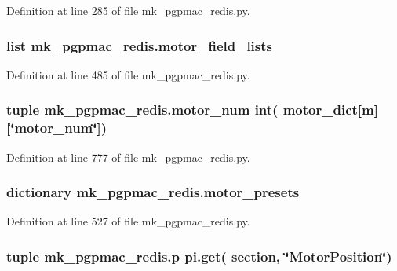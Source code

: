 Definition at line 285 of file mk\-\_\-pgpmac\-\_\-redis.\-py.

\hypertarget{namespacemk__pgpmac__redis_a7228dc1b6ecec376538db1efe8c05ffb}{
\subsubsection[{motor\-\_\-field\-\_\-lists}]{\setlength{\rightskip}{0pt plus 5cm}list mk\-\_\-pgpmac\-\_\-redis.\-motor\-\_\-field\-\_\-lists}}\label{namespacemk__pgpmac__redis_a7228dc1b6ecec376538db1efe8c05ffb}


Definition at line 485 of file mk\-\_\-pgpmac\-\_\-redis.\-py.

\hypertarget{namespacemk__pgpmac__redis_a292515b2acabb0dcade5b16584cdb011}{
\subsubsection[{motor\-\_\-num}]{\setlength{\rightskip}{0pt plus 5cm}tuple mk\-\_\-pgpmac\-\_\-redis.\-motor\-\_\-num int( {\bf motor\-\_\-dict}\mbox{[}m\mbox{]}\mbox{[}\char`\"{}motor\-\_\-num\char`\"{}\mbox{]})}}\label{namespacemk__pgpmac__redis_a292515b2acabb0dcade5b16584cdb011}


Definition at line 777 of file mk\-\_\-pgpmac\-\_\-redis.\-py.

\hypertarget{namespacemk__pgpmac__redis_a2a04d8d0b7270384d1fac674c29e774a}{
\subsubsection[{motor\-\_\-presets}]{\setlength{\rightskip}{0pt plus 5cm}dictionary mk\-\_\-pgpmac\-\_\-redis.\-motor\-\_\-presets}}\label{namespacemk__pgpmac__redis_a2a04d8d0b7270384d1fac674c29e774a}


Definition at line 527 of file mk\-\_\-pgpmac\-\_\-redis.\-py.

\hypertarget{namespacemk__pgpmac__redis_a11daf2847f2dc94562b5b61b3f412574}{
\subsubsection[{p}]{\setlength{\rightskip}{0pt plus 5cm}tuple mk\-\_\-pgpmac\-\_\-redis.\-p pi.\-get( section, \char`\"{}Motor\-Position\char`\"{})}}\label{namespacemk__pgpmac__redis_a11daf2847f2dc94562b5b61b3f412574}


